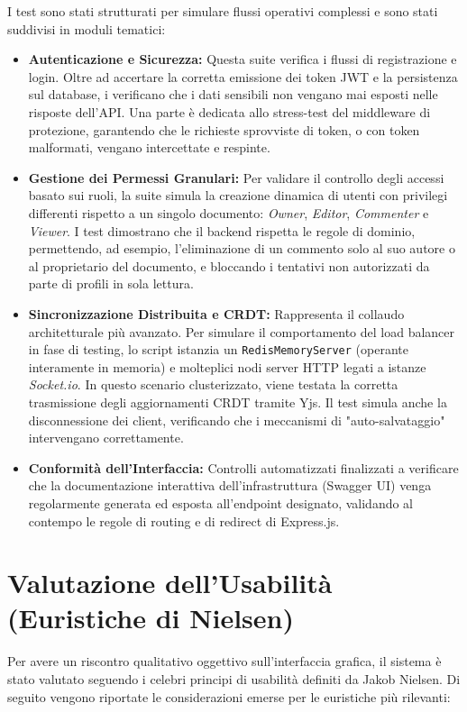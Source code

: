 \documentclass[11pt,a4paper]{report}
\begin{document}
I test sono stati strutturati per simulare flussi operativi complessi e sono stati suddivisi in moduli tematici:

\begin{itemize}
    \item \textbf{Autenticazione e Sicurezza:} Questa suite verifica i flussi di registrazione e login. Oltre ad accertare la corretta emissione dei token JWT e la persistenza sul database, i verificano che i dati sensibili non vengano mai esposti nelle risposte dell'API. Una parte è dedicata allo stress-test del middleware di protezione, garantendo che le richieste sprovviste di token, o con token malformati, vengano intercettate e respinte.
    \item \textbf{Gestione dei Permessi Granulari:} Per validare il controllo degli accessi basato sui ruoli, la suite simula la creazione dinamica di utenti con privilegi differenti rispetto a un singolo documento: \textit{Owner}, \textit{Editor}, \textit{Commenter} e \textit{Viewer}. I test dimostrano che il backend rispetta le regole di dominio, permettendo, ad esempio, l'eliminazione di un commento solo al suo autore o al proprietario del documento, e bloccando i tentativi non autorizzati da parte di profili in sola lettura.
    \item \textbf{Sincronizzazione Distribuita e CRDT:} Rappresenta il collaudo architetturale più avanzato. Per simulare il comportamento del load balancer in fase di testing, lo script istanzia un \texttt{RedisMemoryServer} (operante interamente in memoria) e molteplici nodi server HTTP legati a istanze \textit{Socket.io}. In questo scenario clusterizzato, viene testata la corretta trasmissione degli aggiornamenti CRDT tramite Yjs. Il test simula anche la disconnessione dei client, verificando che i meccanismi di "auto-salvataggio" intervengano correttamente.
    \item \textbf{Conformità dell'Interfaccia:} Controlli automatizzati finalizzati a verificare che la documentazione interattiva dell'infrastruttura (Swagger UI) venga regolarmente generata ed esposta all'endpoint designato, validando al contempo le regole di routing e di redirect di Express.js.
\end{itemize}

\section{Valutazione dell'Usabilità (Euristiche di Nielsen)}
Per avere un riscontro qualitativo oggettivo sull'interfaccia grafica, il sistema è stato valutato seguendo i celebri principi di usabilità definiti da Jakob Nielsen. Di seguito vengono riportate le considerazioni emerse per le euristiche più rilevanti:
\end{document}

